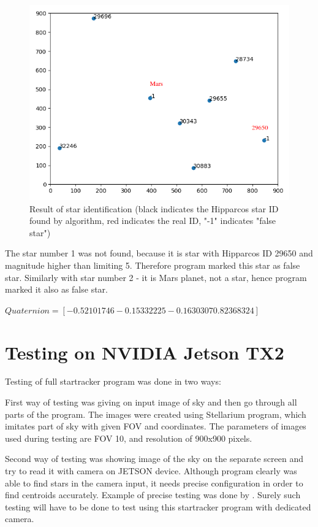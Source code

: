 \documentclass[12pt,a4paper,oneside]{article}
\begin{document}
\begin{figure}[!htbp]
\includegraphics[scale=0.6]{example_2.png}
\centering
\caption{Result of star identification (black indicates the Hipparcos star ID found by algorithm, red indicates the real ID, "-1" indicates "false star")}
\label{fig:example_2}
\end{figure}

The star number 1 was not found, because it is star with Hipparcos ID 29650 and magnitude higher than limiting 5. Therefore program marked this star as false star. Similarly with star number 2 - it is Mars planet, not a star, hence program marked it also as false star.

$Quaternion = [-0.52101746 -0.15332225 -0.1630307 0.82368324]$


\newpage
\section{Testing on NVIDIA Jetson TX2}

Testing of full startracker program was done in two ways:

First way of testing was giving on input image of sky and then go through all parts of the program. The images were created using Stellarium program, which imitates part of sky with given FOV and coordinates. The parameters of images used during testing are FOV 10\degree , and resolution of 900x900 pixels.

Second way of testing was showing image of the sky on the separate screen and try to read it with camera on JETSON device. Although program clearly was able to find stars in the camera input, it needs precise configuration in order to find centroids accurately. Example of precise testing was done by \citet{tappe2011star}. Surely such testing will have to be done to test using this startracker program with dedicated camera.
\end{document}
